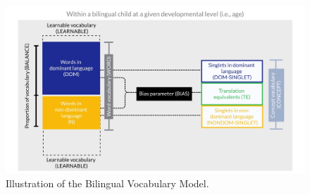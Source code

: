 \documentclass[
  english,
  ,man,floatsintext]{apa6}
\begin{document}
\begin{figure}

{\centering \includegraphics[width=0.9\linewidth]{./Figure1_illustration} 

}

\caption{Illustration of the Bilingual Vocabulary Model.}\label{fig:fig1}
\end{figure}
\end{document}
